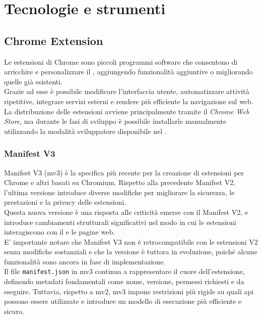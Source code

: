 \section{Tecnologie e strumenti}
\subsection{Chrome Extension}
\noindent Le estensioni di Chrome sono piccoli programmi software che consentono di arricchire e personalizzare il , aggiungendo funzionalità aggiuntive o migliorando quelle già esistenti.\\
Grazie ad esse è possibile modificare l’interfaccia utente, automatizzare attività ripetitive, integrare servizi esterni e rendere più efficiente la navigazione sul web.\\ 
La distribuzione delle estensioni avviene principalmente tramite il \textit{Chrome Web Store}, ma durante le fasi di sviluppo è possibile installarle manualmente utilizzando la modalità sviluppatore disponibile nel .

\subsubsection{Manifest V3}
\noindent Manifest V3 (\acrshort{mv3}) è la specifica più recente per la creazione di estensioni per Chrome e altri  basati su Chromium. Rispetto alla precedente Manifest V2, l'ultima versione introduce diverse modifiche per migliorare la sicurezza, le prestazioni e la privacy delle estensioni.  \\
Questa nuova versione è una risposta alle criticità emerse con il Manifest V2, e introduce cambiamenti strutturali significativi nel modo in cui le estensioni interagiscono con il  e le pagine web.\\
E' importante notare che Manifest V3 non è retrocompatibile con le estensioni V2 senza modifiche sostanziali e che la versione è tuttora in evoluzione, poiché alcune funzionalità sono ancora in fase di implementazione.\\
Il file \texttt{manifest.json} in \acrshort{mv3} continua a rappresentare il cuore dell’estensione, definendo metadati fondamentali come nome, versione, permessi richiesti e  da eseguire. Tuttavia, rispetto a \acrshort{mv2}, \acrshort{mv3} impone restrizioni più rigide su quali \acrshort{api} possono essere utilizzate e introduce un modello di esecuzione più efficiente e sicuro.\\

